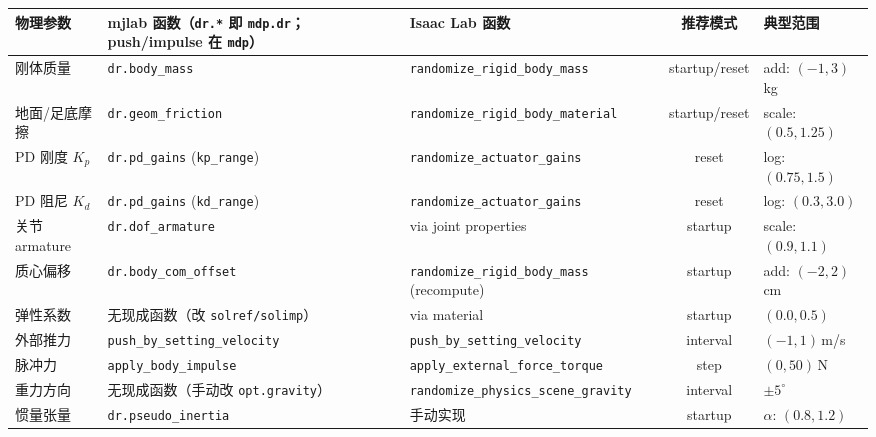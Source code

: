 \begin{center}
\small
\begin{tabular}{@{}lp{3.0cm}p{3.4cm}cl@{}}
\toprule
物理参数 & mjlab 函数（\texttt{dr.*} 即 \texttt{mdp.dr}；push/impulse 在 \texttt{mdp}） & Isaac Lab 函数 & 推荐模式 & 典型范围 \\
\midrule
刚体质量 & \verb|dr.body_mass| & \verb|randomize_rigid_body_mass| & startup/reset & add: $(-1,3)$\,kg \\
地面/足底摩擦 & \verb|dr.geom_friction| & \verb|randomize_rigid_body_material| & startup/reset & scale: $(0.5,1.25)$ \\
PD 刚度 $K_p$ & \verb|dr.pd_gains| (\verb|kp_range|) & \verb|randomize_actuator_gains| & reset & log: $(0.75,1.5)$ \\
PD 阻尼 $K_d$ & \verb|dr.pd_gains| (\verb|kd_range|) & \verb|randomize_actuator_gains| & reset & log: $(0.3,3.0)$ \\
关节 armature & \verb|dr.dof_armature| & via joint properties & startup & scale: $(0.9,1.1)$ \\
质心偏移 & \verb|dr.body_com_offset| & \verb|randomize_rigid_body_mass| (recompute) & startup & add: $(-2,2)$\,cm \\
弹性系数 & 无现成函数（改 \verb|solref/solimp|） & via material & startup & $(0.0,0.5)$ \\
外部推力 & \verb|push_by_setting_velocity| & \verb|push_by_setting_velocity| & interval & $(-1,1)$\,m/s \\
脉冲力 & \verb|apply_body_impulse| & \verb|apply_external_force_torque| & step & $(0,50)$\,N \\
重力方向 & 无现成函数（手动改 \verb|opt.gravity|） & \verb|randomize_physics_scene_gravity| & interval & $\pm 5^\circ$ \\
惯量张量 & \verb|dr.pseudo_inertia| & 手动实现 & startup & $\alpha$: $(0.8,1.2)$ \\
\bottomrule
\end{tabular}
\end{center}

